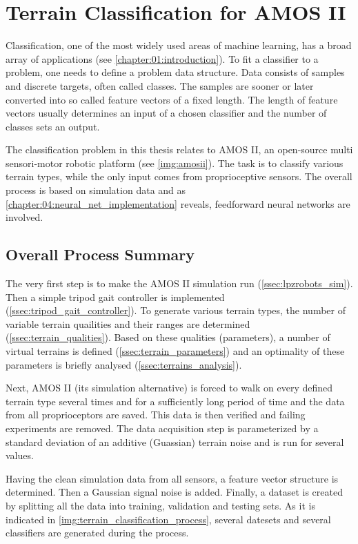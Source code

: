 \chapter{Terrain Classification for AMOS II} \label{chap:terrain_classification}
Classification, one of the most widely used areas of machine learning, has a broad array of applications (see \cref{chapter:01:introduction}). To fit a classifier to a problem, one needs to define a problem data structure. Data consists of samples and discrete targets, often called classes. The samples are sooner or later converted into so called feature vectors of a fixed length. The length of feature vectors usually determines an input of a chosen classifier and the number of classes sets an output.

The classification problem in this thesis relates to AMOS II, an open-source multi sensori-motor robotic platform (see \cref{img:amosii}). The task is to classify various terrain types, while the only input comes from proprioceptive sensors. The overall process is based on simulation data and as \cref{chapter:04:neural_net_implementation} reveals, feedforward neural networks are involved.

\section{Overall Process Summary} \label{sec:overall_process_summary}
The very first step is to make the AMOS II simulation run (\cref{ssec:lpzrobots_sim}). Then a simple tripod gait controller is implemented (\cref{ssec:tripod_gait_controller}). To generate various terrain types, the number of variable terrain quailities and their ranges are determined (\cref{ssec:terrain_qualities}). Based on these qualities (parameters), a number of virtual terrains is defined (\cref{ssec:terrain_parameters}) and an optimality of these parameters is briefly analysed (\cref{ssec:terrains_analysis}).

Next, AMOS II (its simulation alternative) is forced to walk on every defined terrain type several times and for a sufficiently long period of time and the data from all proprioceptors are saved. This data is then verified and failing experiments are removed. The data acquisition step is parameterized by a standard deviation of an additive (Guassian) terrain noise and is run for several values.

Having the clean simulation data from all sensors, a feature vector structure is determined. Then a Gaussian signal noise is added. Finally, a dataset is created by splitting all the data into training, validation and testing sets. As it is indicated in \cref{img:terrain_classification_process}, several datesets and several classifiers are generated during the process. 

